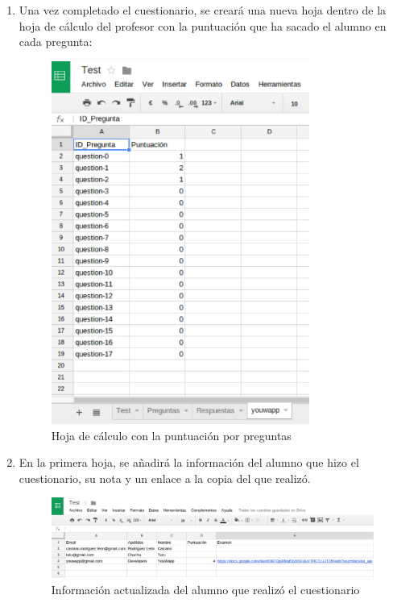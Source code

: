 \begin{enumerate}
  \item Una vez completado el cuestionario, se crear\'a una nueva hoja dentro de la hoja de c\'alculo del profesor con la puntuaci\'on que ha
  sacado el alumno en cada pregunta:
  \begin{figure}[!th]
  \begin{center}
  \includegraphics[width=0.8\textwidth]{images/app15.eps}
  \caption{Hoja de c\'alculo con la puntuaci\'on por preguntas}
  \label{fig:app15}
  \end{center}
  \end{figure}
  \newpage
  
  \item En la primera hoja, se a\~{n}adir\'a la informaci\'on del alumno que hizo el cuestionario, su nota y un enlace a la copia del  que realiz\'o.
  \begin{figure}[!th]
  \begin{center}
  \includegraphics[width=1.1\textwidth]{images/app16.eps}
  \caption{Informaci\'on actualizada del alumno que realiz\'o el cuestionario}
  \label{fig:app16}
  \end{center}
  \end{figure}
  

\end{enumerate}
